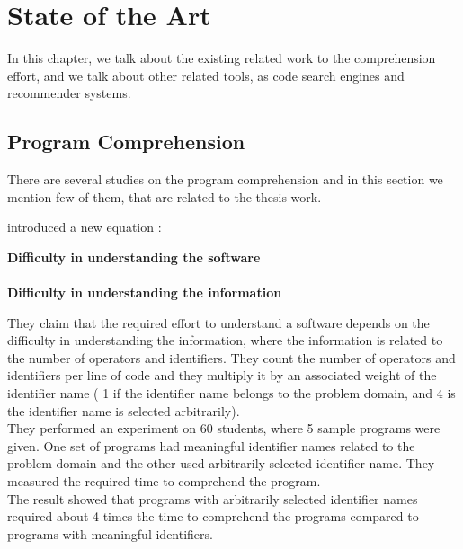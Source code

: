 \documentclass[12pt,mscthesis]{usiinfthesis}
\begin{document}
\chapter{State of the Art}
	In this chapter, we talk about the existing related work to the comprehension effort, and we talk about other related tools, as code search engines and recommender systems.\\ 
\section{Program Comprehension}
	There are several studies on the program comprehension and in this section we mention few of them, that are related to the thesis work.


\cite{Corbi:1989:PUC:97118.97124}

	\citet{Kushwaha:2006:ICI:1163514.1163533}  introduced a new equation :\\
	\begin{center}
	 \textbf{Difficulty in understanding the software}\\
	 \approx\\
	  \textbf{Difficulty in understanding the information}
	  \end{center}

	They claim that the required effort to understand a software depends on the difficulty in understanding the information, where the information is related to the number of operators and identifiers. They count the number of operators and identifiers per line of code and they multiply it by an associated weight of the identifier name ( 1 if the identifier name belongs to the problem domain, and 4 is the identifier name is selected arbitrarily). \\
	They performed an experiment on 60 students, where 5 sample programs were given. One set of programs had meaningful identifier names related to the problem domain and the other used arbitrarily selected identifier name. They measured the required time to comprehend the program.\\ 
	The result showed that programs with arbitrarily selected identifier names required about 4 times the time to comprehend the programs compared to programs with meaningful identifiers.\\
\end{document}
